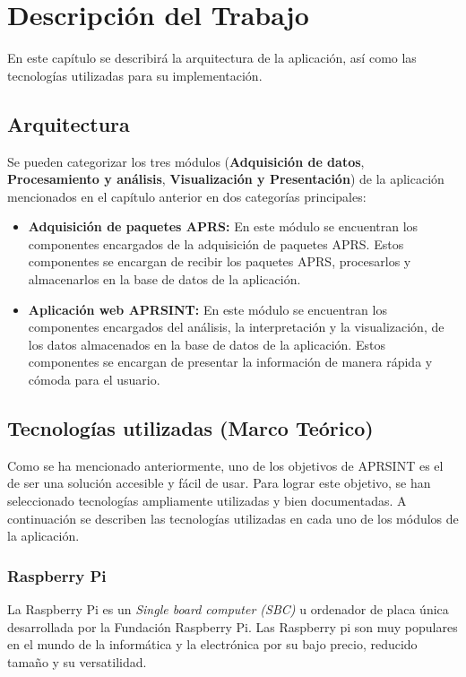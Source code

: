 \chapter{Descripción del Trabajo}
\label{cap:descripcionTrabajo}

En este capítulo se describirá la arquitectura de la aplicación, así como las tecnologías utilizadas para su implementación.

\section{Arquitectura}

Se pueden categorizar los tres módulos (\textbf{Adquisición de datos}, \textbf{Procesamiento y análisis}, \textbf{Visualización y Presentación}) de la aplicación mencionados en el capítulo anterior en dos categorías principales:

\begin{itemize}
	\item \textbf{Adquisición de paquetes APRS:} En este módulo se encuentran los componentes encargados de la adquisición de paquetes APRS. Estos componentes se encargan de recibir los paquetes APRS, procesarlos y almacenarlos en la base de datos de la aplicación.

	\item \textbf{Aplicación web APRSINT:} En este módulo se encuentran los componentes encargados del análisis, la interpretación y la visualización, de los datos almacenados en la base de datos de la aplicación. Estos componentes se encargan de presentar la información de manera rápida y cómoda para el usuario.
\end{itemize}

\section{Tecnologías utilizadas (Marco Teórico)}

Como se ha mencionado anteriormente, uno de los objetivos de APRSINT es el de ser una solución accesible y fácil de usar. Para lograr este objetivo, se han seleccionado tecnologías ampliamente utilizadas y bien documentadas. A continuación se describen las tecnologías utilizadas en cada uno de los módulos de la aplicación.
\subsection*{Raspberry Pi}

La Raspberry Pi es un \textit{Single board computer (SBC)} u ordenador de placa única desarrollada por la Fundación Raspberry Pi. Las Raspberry pi son muy populares en el mundo de la informática y la electrónica por su bajo precio, reducido tamaño y su versatilidad.

